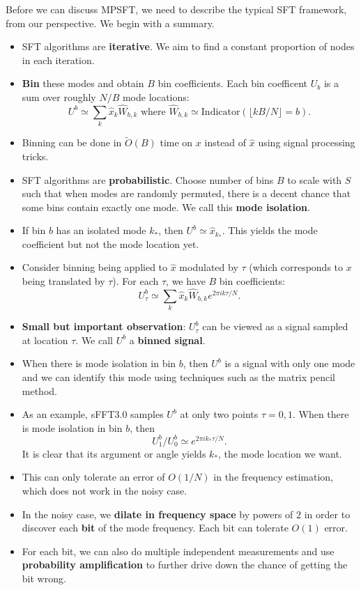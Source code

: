 \documentclass[10pt]{article}
\begin{document}
Before we can discuss MPSFT, we need to describe the typical SFT framework, from our perspective. We begin with a summary.
\begin{itemize}
\item SFT algorithms are \textbf{iterative}. We aim to find a constant proportion of nodes in each iteration.

\item \textbf{Bin} these modes and obtain $B$ bin coefficients. Each bin coefficent $U_b$ is a sum over roughly $N/B$ mode locations:
$$U^b \simeq \sum_k \hat{x}_k \hat{W}_{b,k} \text{ where } \hat{W}_{b,k} \simeq \text{Indicator}(\lfloor kB/N \rfloor = b).$$

\item Binning can be done in $\tilde{O}(B)$ time on $x$ instead of $\hat{x}$ using signal processing tricks.

\item SFT algorithms are \textbf{probabilistic}. Choose number of bins $B$ to scale with $S$ such that when modes are randomly permuted, there is a decent chance that some bins contain exactly one mode. We call this \textbf{mode isolation}.

\item If bin $b$ has an isolated mode $k_*$, then $U^b \simeq \hat{x}_{k_*}$. This yields the mode coefficient but not the mode location yet.

\item Consider binning being applied to $\hat{x}$ modulated by $\tau$ (which corresponds to $x$ being translated by $\tau$). For each $\tau$, we have $B$ bin coefficients:
$$U^b_{\tau} \simeq \sum_k \hat{x}_k \hat{W}_{b,k} e^{2\pi i k \tau/N}.$$

\item \textbf{Small but important observation}: $U^b_{\tau}$ can be viewed as a signal sampled at location $\tau$. We call $U^b$ a \textbf{binned signal}.

\item When there is mode isolation in bin $b$, then $U^b$ is a signal with only one mode and we can identify this mode using techniques such as the matrix pencil method.

\item As an example, sFFT3.0 samples $U^b$ at only two points $\tau=0,1$. When there is mode isolation in bin $b$, then
$$U^b_1/U^b_0 \simeq e^{2\pi i k_*\tau/N}.$$
It is clear that its argument or angle yields $k_*$, the mode location we want.

\item This can only tolerate an error of $O(1/N)$ in the frequency estimation, which does not work in the noisy case.

\item In the noisy case, we \textbf{dilate in frequency space} by powers of $2$ in order to discover each \textbf{bit} of the mode frequency. Each bit can tolerate $O(1)$ error.

\item For each bit, we can also do multiple independent measurements and use \textbf{probability amplification} to further drive down the chance of getting the bit wrong.

\end{itemize}
\end{document}
